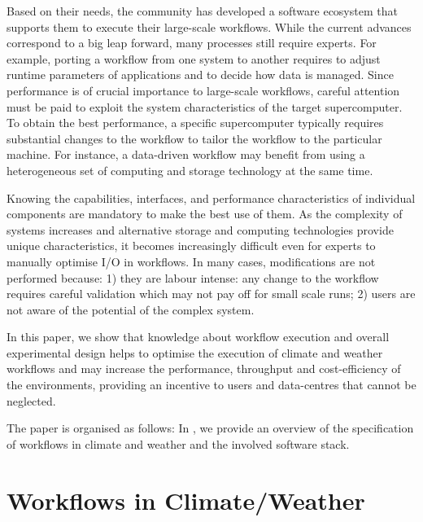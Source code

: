 \documentclass[a4paper]{article}
\newcommand{\jk}[1]{\todo[inline]{JK: #1}}
\begin{document}
Based on their needs, the {\color{cyan}{HPC}} community has developed a software ecosystem that supports them to execute their large-scale workflows.
While the current advances correspond to a big leap forward, many processes still require experts.
For example, porting a workflow from one system to another requires to adjust runtime parameters of applications and to decide how data is managed.
Since performance is of crucial importance to large-scale workflows, careful attention must be paid to exploit the system characteristics of the target supercomputer.
To obtain the best performance, a specific supercomputer typically requires substantial changes to the workflow to tailor the workflow to the particular machine.
For instance, a data-driven workflow may benefit from using a heterogeneous set of computing and storage technology at the same time.

Knowing the capabilities, interfaces, and performance characteristics of individual components are mandatory to make the best use of them.
As the complexity of systems increases and alternative storage and computing technologies provide unique characteristics, it becomes increasingly difficult even for experts to manually optimise I/O in workflows. {\color{cyan}{First time I/O is mentioned. I would change to something like... it becomes increasingly difficult even for experts to manually optimise resources (other stuff) and, in particular, I/O in such workflows.}}
In many cases, modifications are not performed because: 1) they are labour intense: any change to the workflow requires careful validation which may not pay off for small scale runs; 2) users are not aware of the potential of the complex system.

In this paper, we show that knowledge about workflow execution and overall experimental design helps to
optimise the execution of climate and weather workflows and may increase the performance, throughput and cost-efficiency of the environments, providing an incentive to users and data-centres that cannot be neglected.

The paper is organised as follows:
In , we provide an overview of the specification of workflows in climate and weather and the involved software stack.

\jk{TODO}


\section{Workflows in Climate/Weather}
\label{sec:workflows}
\end{document}

